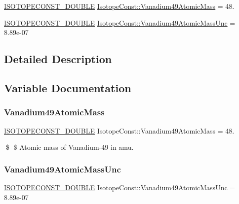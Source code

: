 \begin{DoxyCompactItemize}
\item 
\mbox{\hyperlink{group___isotope_const-_macros_ga8f45a7272ce02c0b4c65c44636ed719a}{I\+S\+O\+T\+O\+P\+E\+C\+O\+N\+S\+T\+\_\+\+D\+O\+U\+B\+LE}} \mbox{\hyperlink{group___isotope_const-_vanadium-_v49_gaf49ce964e70161bcc0b633064ee9800b}{Isotope\+Const\+::\+Vanadium49\+Atomic\+Mass}} = 48.
\item 
\mbox{\hyperlink{group___isotope_const-_macros_ga8f45a7272ce02c0b4c65c44636ed719a}{I\+S\+O\+T\+O\+P\+E\+C\+O\+N\+S\+T\+\_\+\+D\+O\+U\+B\+LE}} \mbox{\hyperlink{group___isotope_const-_vanadium-_v49_gac9a8c208966a6297ac5937d4a99d93e5}{Isotope\+Const\+::\+Vanadium49\+Atomic\+Mass\+Unc}} = 8.\+89e-\/07
\end{DoxyCompactItemize}


\subsection{Detailed Description}


\subsection{Variable Documentation}
\mbox{\label{group___isotope_const-_vanadium-_v49_gaf49ce964e70161bcc0b633064ee9800b}} 
\subsubsection{\texorpdfstring{Vanadium49\+Atomic\+Mass}{Vanadium49AtomicMass}}
{\footnotesize\ttfamily \mbox{\hyperlink{group___isotope_const-_macros_ga8f45a7272ce02c0b4c65c44636ed719a}{I\+S\+O\+T\+O\+P\+E\+C\+O\+N\+S\+T\+\_\+\+D\+O\+U\+B\+LE}} Isotope\+Const\+::\+Vanadium49\+Atomic\+Mass = 48.}

\$ \$ Atomic mass of Vanadium-\/49 in amu. \mbox{\label{group___isotope_const-_vanadium-_v49_gac9a8c208966a6297ac5937d4a99d93e5}} 
\subsubsection{\texorpdfstring{Vanadium49\+Atomic\+Mass\+Unc}{Vanadium49AtomicMassUnc}}
{\footnotesize\ttfamily \mbox{\hyperlink{group___isotope_const-_macros_ga8f45a7272ce02c0b4c65c44636ed719a}{I\+S\+O\+T\+O\+P\+E\+C\+O\+N\+S\+T\+\_\+\+D\+O\+U\+B\+LE}} Isotope\+Const\+::\+Vanadium49\+Atomic\+Mass\+Unc = 8.\+89e-\/07}

